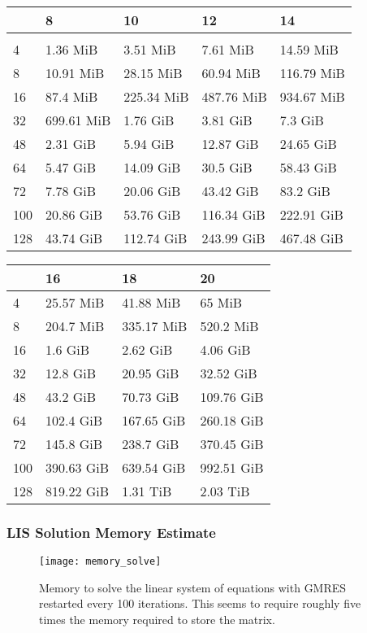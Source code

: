 \begin{tabular}{lllll}
\toprule
{}  &          8  &          10 &          12 &          14 \\
\midrule                                                    \\
4   &    1.36 MiB &    3.51 MiB &    7.61 MiB &   14.59 MiB \\
8   &   10.91 MiB &   28.15 MiB &   60.94 MiB &  116.79 MiB \\
16  &    87.4 MiB &  225.34 MiB &  487.76 MiB &  934.67 MiB \\
32  &  699.61 MiB &    1.76 GiB &    3.81 GiB &     7.3 GiB \\
48  &    2.31 GiB &    5.94 GiB &   12.87 GiB &   24.65 GiB \\
64  &    5.47 GiB &   14.09 GiB &    30.5 GiB &   58.43 GiB \\
72  &    7.78 GiB &   20.06 GiB &   43.42 GiB &    83.2 GiB \\
100 &   20.86 GiB &   53.76 GiB &  116.34 GiB &  222.91 GiB \\
128 &   43.74 GiB &  112.74 GiB &  243.99 GiB &  467.48 GiB \\
\bottomrule
\end{tabular}

\begin{tabular}{llll}
\toprule
{}  &          16 &          18 &          20 \\
\midrule                                             
4   &   25.57 MiB &   41.88 MiB &      65 MiB \\
8   &   204.7 MiB &  335.17 MiB &   520.2 MiB \\
16  &     1.6 GiB &    2.62 GiB &    4.06 GiB \\
32  &    12.8 GiB &   20.95 GiB &   32.52 GiB \\
48  &    43.2 GiB &   70.73 GiB &  109.76 GiB \\
64  &   102.4 GiB &  167.65 GiB &  260.18 GiB \\
72  &   145.8 GiB &   238.7 GiB &  370.45 GiB \\
100 &  390.63 GiB &  639.54 GiB &  992.51 GiB \\
128 &  819.22 GiB &    1.31 TiB &    2.03 TiB \\
\bottomrule
\end{tabular}

\subsubsection{LIS Solution Memory Estimate}
\begin{figure}[H]
  \centering
  \texttt{[image: memory\_solve]}
  \caption{Memory to solve the linear system of equations with GMRES restarted every 100 iterations. This seems to require roughly five times the memory required to store the matrix.}
  \label{fig:memory_solve}
\end{figure}

